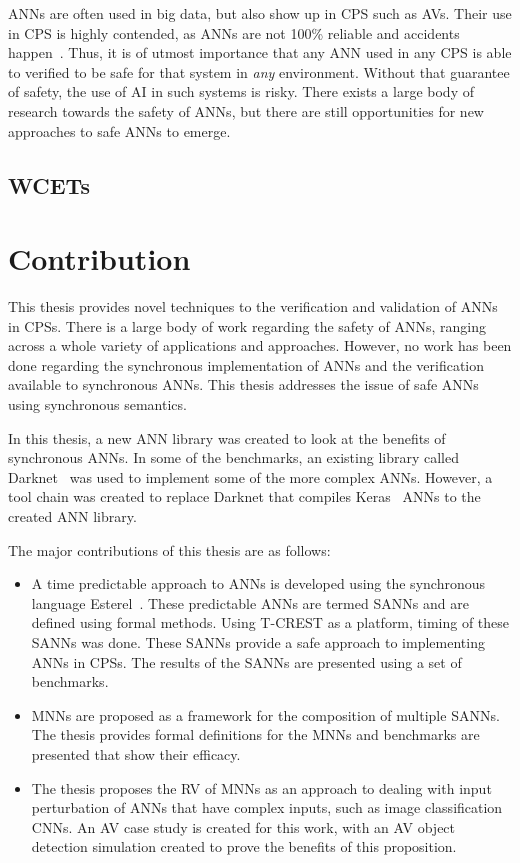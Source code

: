 \acp{ANN} are often used in big data, but also show up in \ac{CPS} such as \acfp{AV}.
Their use in \ac{CPS} is highly contended, as \acp{ANN} are not 100\% reliable and accidents happen~\cite{coldewey_2018}.
Thus, it is of utmost importance that any \ac{ANN} used in any \ac{CPS} is able to verified to be safe for that system in \textit{any} environment.
Without that guarantee of safety, the use of \ac{AI} in such systems is risky.
There exists a large body of research towards the safety of \acp{ANN}, but there are still opportunities for new approaches to safe \acp{ANN} to emerge.

\subsection{\acfp{WCET}}

\section{Contribution}
This thesis provides novel techniques to the verification and validation of \acfp{ANN} in \acfp{CPS}.
There is a large body of work regarding the safety of \acp{ANN}, ranging across a whole variety of applications and approaches.
However, no work has been done regarding the synchronous implementation of \acp{ANN} and the verification available to synchronous \acp{ANN}.  
This thesis addresses the issue of safe \acp{ANN} using synchronous semantics.

In this thesis, a new \ac{ANN} library was created to look at the benefits of synchronous \acp{ANN}.
In some of the benchmarks, an existing library called Darknet~\cite{darknet13} was used to implement some of the more complex \acp{ANN}.
However, a tool chain was created to replace Darknet that compiles Keras~\cite{chollet2015keras} \acp{ANN} to the created \ac{ANN} library.

The major contributions of this thesis are as follows:
\begin{itemize}
	\item A time predictable approach to \acp{ANN} is developed using the synchronous language Esterel~\cite{berry2000foundations}. These predictable \acp{ANN} are termed \acfp{SANN} and are defined using formal methods. Using T-CREST as a platform, timing of these \acp{SANN} was done. These \acp{SANN} provide a safe approach to implementing \acp{ANN} in \acp{CPS}. The results of the \acp{SANN} are presented using a set of benchmarks. 
	\item \acfp{MNN} are proposed as a framework for the composition of multiple \acp{SANN}. The thesis provides formal definitions for the \acp{MNN} and benchmarks are presented that show their efficacy. 
	\item The thesis proposes the \acf{RV} of \acp{MNN} as an approach to dealing with input perturbation of \acp{ANN} that have complex inputs, such as image classification \acfp{CNN}. An \acf{AV} case study is created for this work, with an \ac{AV} object detection simulation created to prove the benefits of this proposition. 
\end{itemize}

